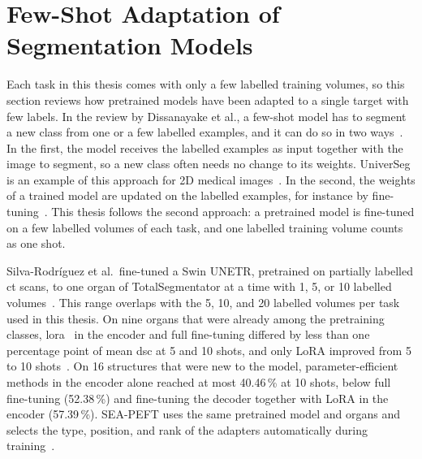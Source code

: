 \section{Few-Shot Adaptation of Segmentation Models}
\label{sec:sota-few-shot}

Each task in this thesis comes with only a few labelled training volumes, so this section reviews how pretrained models have been adapted to a single target with few labels.
In the review by Dissanayake et al., a few-shot model has to segment a new class from one or a few labelled examples, and it can do so in two ways~\cite[Sec.~2.2]{theekshana26fewshot}.
In the first, the model receives the labelled examples as input together with the image to segment, so a new class often needs no change to its weights.
UniverSeg is an example of this approach for 2D medical images~\cite{universeg}.
In the second, the weights of a trained model are updated on the labelled examples, for instance by fine-tuning~\cite[Sec.~2.2]{theekshana26fewshot}.
This thesis follows the second approach: a pretrained model is fine-tuned on a few labelled volumes of each task, and one labelled training volume counts as one shot.

Silva-Rodríguez et al.\ fine-tuned a Swin UNETR, pretrained on partially labelled \gls{ct} scans, to one organ of TotalSegmentator at a time with 1, 5, or 10 labelled volumes~\cite{silvarodriguez2023fseft}.
This range overlaps with the 5, 10, and 20 labelled volumes per task used in this thesis.
On nine organs that were already among the pretraining classes, \gls{lora}~\cite{hu2022lora} in the encoder and full fine-tuning differed by less than one percentage point of mean \gls{dsc} at 5 and 10 shots, and only LoRA improved from 5 to 10 shots~\cite{silvarodriguez2023fseft}.
On 16 structures that were new to the model, parameter-efficient methods in the encoder alone reached at most 40.46\,\% at 10 shots, below full fine-tuning (52.38\,\%) and fine-tuning the decoder together with LoRA in the encoder (57.39\,\%).
SEA-PEFT uses the same pretrained model and organs and selects the type, position, and rank of the adapters automatically during training~\cite{ly2026seapeft}.

